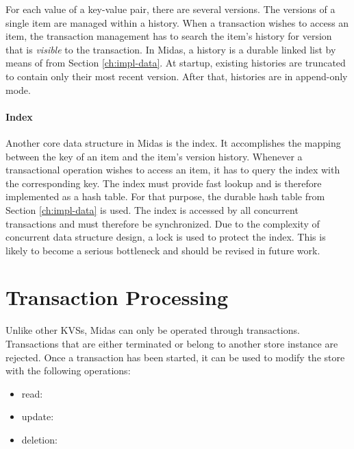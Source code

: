 For each value of a key-value pair, there are several versions. The versions of a single item are managed within a history. When a transaction wishes to access an item, the transaction management has to search the item's history for version that is \emph{visible} to the transaction. In Midas, a history is a durable linked list by means of  from Section \ref{ch:impl-data}. At startup, existing histories are truncated to contain only their most recent version. After that, histories are in append-only mode.

\paragraph{Index}

Another core data structure in Midas is the index. It accomplishes the mapping between the key of an item and the item's version history. Whenever a transactional operation wishes to access an item, it has to query the index with the corresponding key. The index must provide fast lookup and is therefore implemented as a hash table. For that purpose, the durable hash table  from Section \ref{ch:impl-data} is used. The index is accessed by all concurrent transactions and must therefore be synchronized. Due to the complexity of concurrent data structure design, a lock is used to protect the index. This is likely to become a serious bottleneck and should be revised in future work.


\section{Transaction Processing}

Unlike other \acp{KVS}, Midas can only be operated through transactions. Transactions that are either terminated or belong to another store instance are rejected. Once a transaction has been started, it can be used to modify the store with the following operations:

\begin{itemize}
    \item read: 
    \item update: 
    \item deletion: 
\end{itemize}


